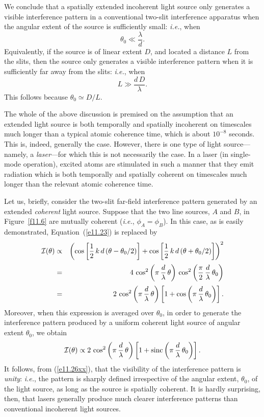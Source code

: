 We conclude that a spatially extended incoherent light source only generates a visible interference pattern in a
conventional two-slit interference apparatus when the angular extent of the source is
sufficiently small: {\em i.e.}, when
\begin{equation}
\theta_0\ll \frac{\lambda}{d}.
\end{equation}
Equivalently, if the source is of linear extent $D$, and  located a distance $L$ from the slits, then the source
only generates a visible interference pattern when it is sufficiently far away from the slits: {\em i.e.},
when
\begin{equation}
L\gg \frac{d\,D}{\lambda}.
\end{equation}
This follows because $\theta_0\simeq D/L$. 

The whole of the above discussion is premised on the assumption that an extended light source is both
temporally and spatially incoherent on timescales much longer than a typical atomic coherence time, which is about $10^{-8}$ seconds. This
is, indeed, generally the case. However, there is one type of light source---namely, a {\em laser}---for which this is not necessarily  the
case.  In a laser (in single-mode operation), excited atoms are stimulated 
in such a manner that they emit radiation which is both temporally and spatially coherent on timescales
much longer than the relevant atomic coherence time. 

Let us, briefly, consider the two-slit far-field interference pattern generated by an extended {\em coherent}\/ light source.
Suppose that the two line sources, $A$ and $B$, in Figure~\ref{f11.6}
are mutually coherent  ({\em i.e.}, $\phi_A=\phi_B$). In this case,  as is easily demonstrated, Equation~(\ref{e11.23}) is replaced by
\begin{eqnarray}
{\cal I}(\theta) &\propto &\left(\cos\left[\frac{1}{2}\,k\,d\,(\theta-\theta_0/2)\right] + \cos\left[\frac{1}{2}\,k\,d\,(\theta+\theta_0/2)\right] \right)^2\nonumber\\[0.5ex]
&=&4\,\cos^2\left(\pi\,\frac{d}{\lambda}\,\theta\right)\,\cos^2\left(\frac{\pi}{2}\,\frac{d}{\lambda}\,\theta_0\right)\nonumber\\[0.5ex]
&=&
2\,\cos^2\left(\pi\,\frac{d}{\lambda}\,\theta\right)\left[1+\cos\left(\pi\,\frac{d}{\lambda}\,\theta_0\right)\right].
\end{eqnarray}
Moreover, when this expression is averaged over $\theta_0$, in order to generate the interference pattern produced by a uniform coherent light
source of angular extent $\theta_0$, we obtain
\begin{equation}
{\cal I}(\theta)\propto  2\,\cos^2\left(\pi\,\frac{d}{\lambda}\,\theta\right)\left[1+{\rm sinc}\left(\pi\,\frac{d}{\lambda}\,\theta_0\right)\right].
\end{equation}
It follows, from (\ref{e11.26xx}),  that the visibility of the interference pattern is {\em unity}: {\em i.e.}, the pattern is sharply defined irrespective
of the angular extent, $\theta_0$, of the light source, as long as the source is spatially coherent. 
It is hardly surprising, then, that lasers generally produce much clearer  interference patterns than conventional incoherent light sources.  

